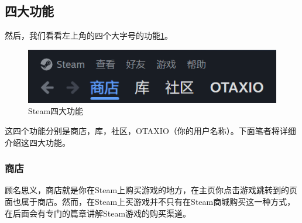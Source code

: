 \documentclass{article}
\begin{document}
    \subsection{四大功能}
    然后，我们看看左上角的四个大字号的功能\ref{fig:四大功能}。
    \begin{figure}[H]
    \centering
    \includegraphics[width=0.7\linewidth]{图/主要四功能.png}
    \caption{\label{fig:四大功能}Steam四大功能}
    \end{figure}
    这四个功能分别是商店，库，社区，OTAXIO（你的用户名称）。下面笔者将详细介绍这四大功能。
        \subsubsection{商店}
        顾名思义，商店就是你在Steam上购买游戏的地方，在主页你点击游戏跳转到的页面也属于商店。然而，在Steam上买游戏并不只有在Steam商城购买这一种方式，在后面会有专门的篇章讲解Steam游戏的购买渠道。
        
\end{document}
